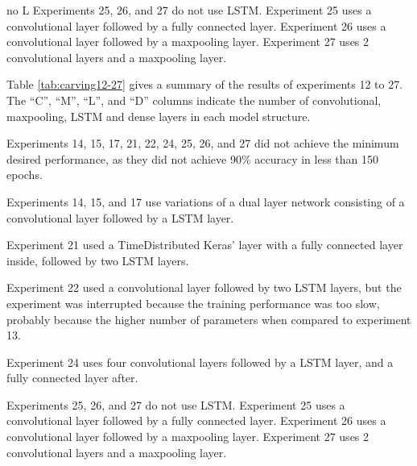 no L
Experiments 25, 26, and 27 do not use LSTM. Experiment 25 uses a convolutional layer followed by a fully connected layer. Experiment 26 uses a convolutional layer followed by a maxpooling layer. Experiment 27 uses 2 convolutional layers and a maxpooling layer.



Table \ref{tab:carving12-27} gives a summary of the results of experiments 12 to 27. The ``C'', ``M'', ``L'', and ``D'' columns indicate the number of convolutional, maxpooling, LSTM and dense layers in each model structure.



Experiments 14, 15, 17, 21, 22, 24, 25, 26, and 27 did not achieve the minimum desired performance, as they did not achieve 90\% accuracy in less than 150 epochs.

Experiments 14, 15, and 17 use variations of a dual layer network consisting of a convolutional layer followed by a LSTM layer.

Experiment 21 used a TimeDistributed Keras' layer with a fully connected layer inside, followed by two LSTM layers.

Experiment 22 used a convolutional layer followed by two LSTM layers, but the experiment was interrupted because the training performance was too slow, probably because the higher number of parameters when compared to experiment 13.

Experiment 24 uses four convolutional layers followed by a LSTM layer, and a fully connected layer after.

Experiments 25, 26, and 27 do not use LSTM. Experiment 25 uses a convolutional layer followed by a fully connected layer. Experiment 26 uses a convolutional layer followed by a maxpooling layer. Experiment 27 uses 2 convolutional layers and a maxpooling layer.


